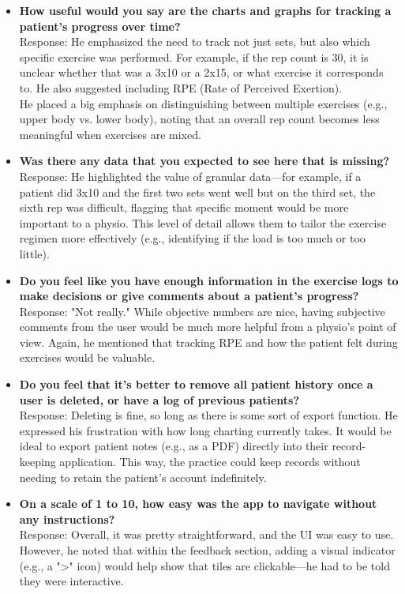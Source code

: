 \documentclass[12pt, titlepage]{article}
\begin{document}
\begin{itemize}
    \item \textbf{How useful would you say are the charts and graphs for tracking a patient's progress over time?} \\
    Response: He emphasized the need to track not just sets, but also which specific exercise was performed. For example, if the rep count is 30, it is unclear whether that was a 3x10 or a 2x15, or what exercise it corresponds to. He also suggested including RPE (Rate of Perceived Exertion). \\
    He placed a big emphasis on distinguishing between multiple exercises (e.g., upper body vs. lower body), noting that an overall rep count becomes less meaningful when exercises are mixed.

    \item \textbf{Was there any data that you expected to see here that is missing?} \\
    Response: He highlighted the value of granular data—for example, if a patient did 3x10 and the first two sets went well but on the third set, the sixth rep was difficult, flagging that specific moment would be more important to a physio. This level of detail allows them to tailor the exercise regimen more effectively (e.g., identifying if the load is too much or too little).

    \item \textbf{Do you feel like you have enough information in the exercise logs to make decisions or give comments about a patient's progress?} \\
    Response: "Not really." While objective numbers are nice, having subjective comments from the user would be much more helpful from a physio's point of view. Again, he mentioned that tracking RPE and how the patient felt during exercises would be valuable.

    \item \textbf{Do you feel that it's better to remove all patient history once a user is deleted, or have a log of previous patients?} \\
    Response: Deleting is fine, so long as there is some sort of export function. He expressed his frustration with how long charting currently takes. It would be ideal to export patient notes (e.g., as a PDF) directly into their record-keeping application. This way, the practice could keep records without needing to retain the patient's account indefinitely.

    \item \textbf{On a scale of 1 to 10, how easy was the app to navigate without any instructions?} \\
    Response: Overall, it was pretty straightforward, and the UI was easy to use. However, he noted that within the feedback section, adding a visual indicator (e.g., a "\textgreater" icon) would help show that tiles are clickable—he had to be told they were interactive.


\end{itemize}
\end{document}
